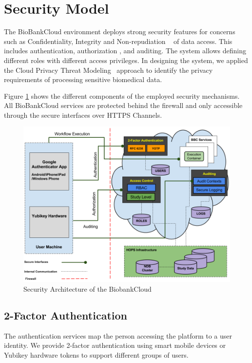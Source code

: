 \section{Security Model}

The BioBankCloud environment deploys strong security features for concerns such as Confidentiality, Integrity and Non-repudiation ~\cite{BBCSEC} of data access. This includes authentication, authorization
, and auditing. The system allows defining different roles with different access privileges. In designing the system, we applied the Cloud Privacy Threat Modeling~\cite {CPTM} approach to identify the privacy requirements of processing sensitive biomedical data.



Figure \ref{fig:security} shows the different components of the employed security mechanisms. All BioBankCloud services are protected behind the firewall and only accessible through the secure interfaces over HTTPS Channels.


\begin{figure}[h]
\centering
\includegraphics[width=\textwidth]{./imgs/security.png}
\caption{Security Architecture of the BiobankCloud}
\label{fig:security}
\end{figure}


\subsection{2-Factor Authentication}
The authentication services map the person accessing the platform to a user identity. We provide 2-factor authentication using smart mobile devices or Yubikey hardware tokens to support different groups of users.

